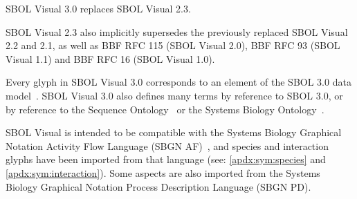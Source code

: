 
SBOL Visual 3.0 replaces SBOL Visual 2.3.
%

SBOL Visual 2.3 also implicitly supersedes the previously replaced SBOL Visual 2.2 and 2.1, as well as BBF RFC 115 (SBOL Visual 2.0), BBF RFC 93 (SBOL Visual 1.1) and BBF RFC 16 (SBOL Visual 1.0).

Every glyph in SBOL Visual 3.0 corresponds to an element of the SBOL 3.0 data model~\citep{SBOL3_0}.
SBOL Visual 3.0 also defines many terms by reference to SBOL 3.0, 
or by reference to the Sequence Ontology~\citep{SequenceOntology}
or the Systems Biology Ontology~\citep{SBO}.

SBOL Visual is intended to be compatible with the Systems Biology Graphical Notation Activity Flow Language (SBGN AF)~\citep{sbgn}, 
and species and interaction glyphs have been imported from that language (see: \ref{apdx:sym:species} and \ref{apdx:sym:interaction}).
Some aspects are also imported from the Systems Biology Graphical Notation Process Description Language (SBGN PD).
